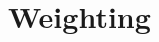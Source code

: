 \documentclass[final,1p,times]{elsarticle}
\newcommand{\compatible}{\smile}
\newcommand{\leafset}{\Lambda}
\newcommand{\weight}{\omega}
\newtheorem{corollary}[theorem]{Corollary}
\begin{document}
%
%
%
%
%
%
%
%
%





    \section{Weighting}
    \label{sec:weighting}
\end{document}
